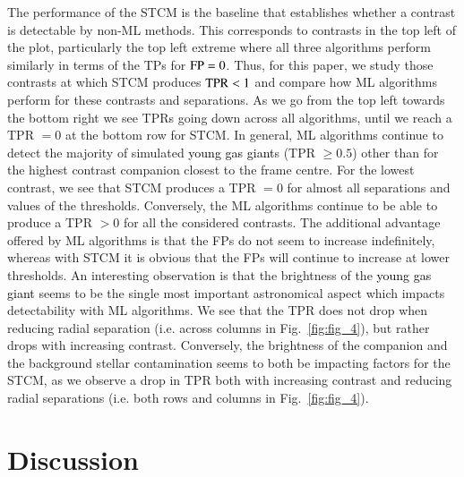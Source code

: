 \documentclass{aa}
\newcommand{\newchange}[1]{\textcolor{black}{#1}}
\begin{document}
The performance of the STCM is the baseline that establishes whether a contrast is detectable by non-ML methods. 
This corresponds to contrasts in the top left of the plot, particularly the top left extreme where all three algorithms perform similarly in terms of the TPs for ${\rm FP}=0$.
Thus, for this paper, we study those contrasts at which STCM produces ${\rm TPR}<1$ and compare how ML algorithms perform for these contrasts and separations.
As we go from the top left towards the bottom right we see TPRs going down across all algorithms, until we reach a TPR $=0$ at the bottom row for STCM. 
In general, ML algorithms continue to detect the majority of simulated \newchange{young gas giant}s (TPR $\ge 0.5$) other than for the highest contrast companion closest to the frame centre.
For the lowest contrast, we see that STCM produces a TPR $=0$ for almost all separations and values of the thresholds.
Conversely, the ML algorithms continue to be able to produce a TPR $>0$ for all the considered contrasts.
The additional advantage offered by ML algorithms is that the FPs do not seem to increase indefinitely, whereas with STCM it is obvious that the FPs will continue to increase at lower thresholds.
An interesting observation is that the brightness of the \newchange{young gas giant} seems to be the single most important astronomical aspect which impacts detectability with ML algorithms.
We see that the TPR does not drop when reducing radial separation (i.e. across columns in Fig.~\ref{fig:fig_4}), but rather drops with increasing contrast. 
Conversely,  the brightness of the companion and the background stellar contamination seems to both be impacting factors for the STCM, as we observe a drop in TPR both with increasing contrast and reducing radial separations (i.e. both rows and columns in Fig.~\ref{fig:fig_4}).




\section{Discussion}
\label{sec:discussion}
\end{document}
